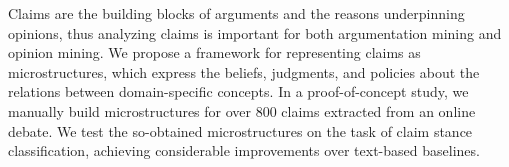 Claims are the building blocks of arguments and the reasons underpinning opinions, thus analyzing claims is important for both argumentation mining and opinion mining. We propose a framework for representing claims as microstructures, which express the beliefs, judgments, and policies about the relations between domain-specific concepts. In a proof-of-concept study, we manually build microstructures for over 800 claims extracted from an online debate. We test the so-obtained microstructures on the task of claim stance classification, achieving considerable improvements over text-based baselines.
